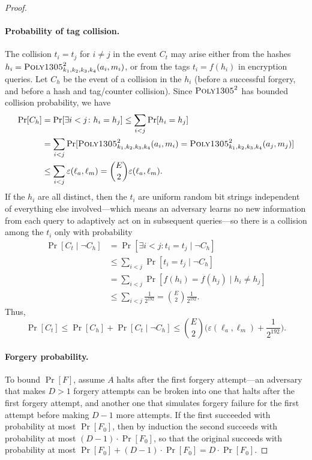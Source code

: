 \documentclass[draft]{article}
\def\operatorsc#1{{%
  \ifmmode\let\next=\operatorname\else\let\next=\relax\fi\next{\textsc{#1}}}}
\def\Poly#1/{\operatorsc{Poly#1}}
\newcommand{\given}{\mathrel|}
\newcommand{\collisionbound}{\varepsilon}
\begin{document}
\begin{proof}
\paragraph*{Probability of tag collision.}
The collision $t_i = t_j$ for $i \ne j$ in the event $C_t$ may arise
 either from the hashes
 $h_i = \Poly1305/^2_{k_1,k_2,k_3,k_4}(a_i, m_i)$,
 or from the tags
 $t_i = f(h_i)$
 in encryption queries.
Let $C_h$ be the event of a collision in the $h_i$ (before a successful
 forgery, and before a hash and tag/counter collision).
Since $\Poly1305/^2$ has bounded collision probability, we have
%
\begin{align*}
  \Pr[C_h]
    &= \Pr[\exists i<j\colon h_i = h_j]
     \leq \sum_{i<j} \Pr[h_i = h_j] \\
    &= \sum_{i<j}
         \Pr[\Poly1305/^2_{k_1,k_2,k_3,k_4}(a_i, m_i)
               = \Poly1305/^2_{k_1,k_2,k_3,k_4}(a_j, m_j)] \\
    &\leq \sum_{i<j} \collisionbound(\ell_a, \ell_m)
     = \binom{E}{2} \collisionbound(\ell_a, \ell_m).
\end{align*}
%
If the $h_i$ are all distinct, then the $t_i$ are uniform random bit
 strings independent of everything else involved---which means an
 adversary learns no new information from each query to adaptively act
 on in subsequent queries---so there is a collision among the $t_i$
 only with probability
%
\begin{align*}
  \Pr[C_t \given \lnot C_h]
    &= \Pr[\exists i<j\colon t_i = t_j \given \lnot C_h] \\
    &\leq \sum_{i<j} \Pr[t_i = t_j \given \lnot C_h] \\
    &= \sum_{i<j} \Pr[f(h_i) = f(h_j) \given h_i \ne h_j] \\
    &\leq \sum_{i<j} \frac{1}{2^{192}}
     = \binom{E}{2} \frac{1}{2^{192}}.
\end{align*}
%
Thus,
\[
  \Pr[C_t] \leq \Pr[C_h] + \Pr[C_t \given \lnot C_h]
    \leq \binom{E}{2} \biggl(
        \collisionbound(\ell_a, \ell_m)
        + \frac{1}{2^{192}}
      \biggr).
\]

\paragraph*{Forgery probability.}
To bound $\Pr[F]$, assume $A$ halts after the first forgery
 attempt---an adversary that makes $D>1$ forgery attempts can be broken
 into one that halts after the first forgery attempt, and another one
 that simulates forgery failure for the first attempt before making
 $D-1$ more attempts.
If the first succeeded with probability at most $\Pr[F_0]$, then by
 induction the second succeeds with probability at most
 $(D - 1) \cdot \Pr[F_0]$,
 so that the original succeeds with probability at most
 $\Pr[F_0] + (D - 1) \cdot \Pr[F_0] = D \cdot \Pr[F_0]$.


\end{proof}
\end{document}
